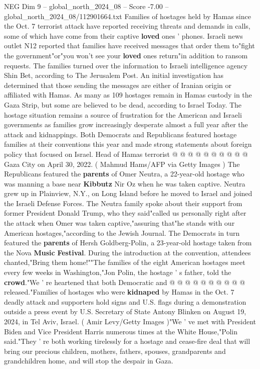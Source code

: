 \begin{textsample}{NEG Dim 9 – global\_north\_2024\_08 – Score -7.00 – global\_north\_2024\_08/112901664.txt}  \label{ex:f9_neg_088}
Families of hostages held by Hamas since the Oct. 7 terrorist attack have reported receiving threats and demands in calls, some of which have come from their captive \textbf{loved} ones ' phones.
Israeli news outlet N12 reported that families have received messages that order them to"fight the government"or"you won't see your \textbf{loved} ones return"in addition to ransom requests.
The families turned over the information to Israeli intelligence agency Shin Bet, according to The Jerusalem Post.
An initial investigation has determined that those sending the messages are either of Iranian origin or affiliated with Hamas.
As many as 109 hostages remain in Hamas custody in the Gaza Strip, but some are believed to be dead, according to Israel Today.
The hostage situation remains a source of frustration for the American and Israeli governments as families grow increasingly desperate almost a full year after the attack and kidnappings.
Both Democrats and Republicans featured hostage families at their conventions this year and made strong statements about foreign policy that focused on Israel.
Head of Hamas terrorist @ @ @ @ @ @ @ @ @ @ Gaza City on April 30, 2022. ( Mahmud Hams/AFP via Getty Images ) The Republicans featured the \textbf{parents} of Omer Neutra, a 22-year-old hostage who was manning a base near \textbf{Kibbutz} Nir Oz when he was taken captive.
Neutra grew up in Plainview, N.Y., on Long Island before he moved to Israel and joined the Israeli Defense Forces.
The Neutra family spoke about their support from former President Donald Trump, who they said"called us personally right after the attack when Omer was taken captive,"assuring that"he stands with our American hostages,"according to the Jewish Journal.
The Democrats in turn featured the \textbf{parents} of Hersh Goldberg-Polin, a 23-year-old hostage taken from the Nova \textbf{Music} \textbf{Festival}.
During the introduction at the convention, attendees chanted,"Bring them home!""The families of the eight American hostages meet every few weeks in Washington,"Jon Polin, the hostage ' s father, told the \textbf{crowd}."We ' re heartened that both Democratic and @ @ @ @ @ @ @ @ @ @ released."Families of hostages who were \textbf{kidnaped} by Hamas in the Oct. 7 deadly attack and supporters hold signs and U.S. flags during a demonstration outside a press event by U.S.
Secretary of State Antony Blinken on August 19, 2024, in Tel Aviv, Israel. ( Amir Levy/Getty Images )"We ' ve met with President Biden and Vice President Harris numerous times at the White House,"Polin said."They ' re both working tirelessly for a hostage and cease-fire deal that will bring our precious children, mothers, fathers, spouses, grandparents and grandchildren home, and will stop the despair in Gaza.

\end{textsample}
